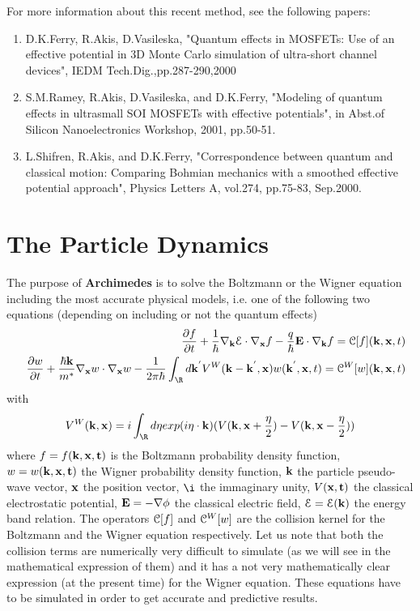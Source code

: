 \documentclass[12pt]{book}
\begin{document}
For more information about this recent method, see the following papers:
\begin{enumerate}
\item
D.K.Ferry, R.Akis, D.Vasileska, "Quantum effects in MOSFETs: Use of an effective potential in 3D Monte Carlo simulation of ultra-short channel devices", IEDM Tech.Dig.,pp.287-290,2000

\item
S.M.Ramey, R.Akis, D.Vasileska, and D.K.Ferry, "Modeling of quantum effects in ultrasmall SOI MOSFETs with effective potentials", in Abst.of Silicon Nanoelectronics Workshop, 2001, pp.50-51.

\item
L.Shifren, R.Akis, and D.K.Ferry, "Correspondence between quantum and classical motion: Comparing Bohmian mechanics with a smoothed effective potential approach", Physics Letters A, vol.274, pp.75-83, Sep.2000.
\end{enumerate}

\section{The Particle Dynamics}
The purpose of \textbf{Archimedes} is to solve the Boltzmann or the Wigner equation including the most accurate physical models, i.e. one of the following two equations (depending on including or not the quantum effects)
\begin{eqnarray}
& & \frac{\partial f}{\partial t} +\frac{1}{\hbar} \nabla_{{\bf{k}}} {\cal{E}} \cdot \nabla_{{\bf{x}}} f -\frac{q}{\hbar} {\bf{E}} \cdot \nabla_{{\bf{k}}} f = {\cal{C}}[f] ({\bf{k}},{\bf{x}},t) \\
& &  \frac{\partial w}{\partial t} +\frac{\hbar {\bf{k}}}{m^*} \nabla_{{\bf{x}}} w \cdot \nabla_{{\bf{x}}} w -\frac{1}{2 \pi \hbar} \int_{\R} d {\bf{k}}^{'} V^{W} ({\bf{k}} - {\bf{k^{'}}}, {\bf{x}}) w({\bf{k^{'}}},{\bf{x}},t) = {\cal{C}}^{W} [w] ({\bf{k}},{\bf{x}},t)
\end{eqnarray}
with
\begin{equation}
 V^{W} ({\bf{k}},{\bf{x}})= i \int_{\R} d {\bf{\eta}} exp( i {\bf{\eta}} \cdot {\bf{k}} ) ( V({\bf{k}},{\bf{x}} + \frac{{\bf{\eta}}}{2})- V({\bf{k}},{\bf{x}} - \frac{{\bf{\eta}}}{2}))
\end{equation}
where $f=f(\bf{k},\bf{x},t)$ is the Boltzmann probability density function, $w=w(\bf{k},\bf{x},t)$ the Wigner probability density function, $\bf{k}$ the particle pseudo-wave vector, $\bf{x}$ the position vector, $\i$ the immaginary unity, $V(\bf{x},t)$ the classical electrostatic potential, ${\bf{E}} = - \nabla \phi$ the classical electric field, ${\cal{E}}={\cal{E}}({\bf{k}})$ the energy band relation. 
The operators ${\cal{C}}[f]$ and ${\cal{C}}^{W}[w]$ are the collision kernel for the Boltzmann and the Wigner equation respectively. Let us note that both the collision terms are numerically very difficult to simulate (as we will see in the mathematical expression of them) and it has a not very mathematically clear expression (at the present time) for the Wigner equation. 
These equations have to be simulated in order to get accurate and predictive results.
\end{document}
